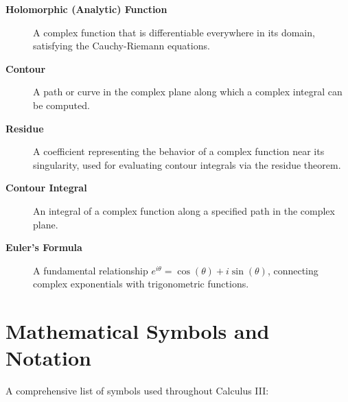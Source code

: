 \begin{description}
  \item[\textbf{Holomorphic (Analytic) Function}] A complex function that is differentiable everywhere in its domain, satisfying the Cauchy-Riemann equations.

  \item[\textbf{Contour}] A path or curve in the complex plane along which a complex integral can be computed.

  \item[\textbf{Residue}] A coefficient representing the behavior of a complex function near its singularity, used for evaluating contour integrals via the residue theorem.

  \item[\textbf{Contour Integral}] An integral of a complex function along a specified path in the complex plane.

  \item[\textbf{Euler's Formula}] A fundamental relationship $e^{i\theta} = \cos(\theta) + i\sin(\theta)$, connecting complex exponentials with trigonometric functions.

\end{description}


\section*{Mathematical Symbols and Notation} 

A comprehensive list of symbols used throughout Calculus III:

